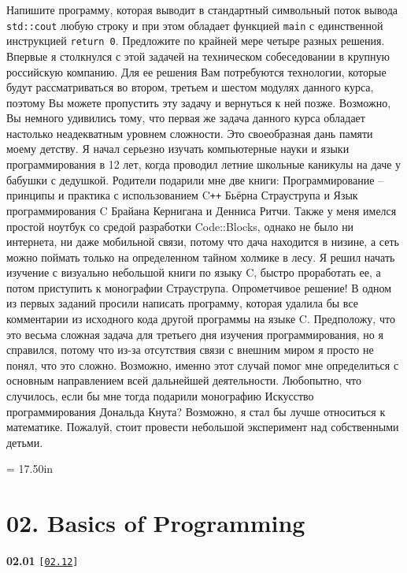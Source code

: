 \documentclass[a4paper,12pt]{article}
\begin{document}
Напишите программу, которая выводит в стандартный символьный поток вывода \lstinline{std::cout} любую строку и при этом обладает функцией \lstinline{main} с единственной инструкцией \lstinline{return 0}. Предложите по крайней мере четыре разных решения. Впервые я столкнулся с этой задачей на техническом собеседовании в крупную российскую компанию. Для ее решения Вам потребуются технологии, которые будут рассматриваться во втором, третьем и шестом модулях данного курса, поэтому Вы можете пропустить эту задачу и вернуться к ней позже. Возможно, Вы немного удивились тому, что первая же задача данного курса обладает настолько неадекватным уровнем сложности. Это своеобразная дань памяти моему детству. Я начал серьезно изучать компьютерные науки и языки программирования в 12 лет, когда проводил летние школьные каникулы на даче у бабушки с дедушкой. Родители подарили мне две книги: Программирование -- принципы и практика с использованием C\texttt{++} Бьёрна Страуструпа и Язык программирования C Брайана Кернигана и Денниса Ритчи. Также у меня имелся простой ноутбук со средой разработки Code::Blocks, однако не было ни интернета, ни даже мобильной связи, потому что дача находится в низине, а сеть можно поймать только на определенном тайном холмике в лесу. Я решил начать изучение с визуально небольшой книги по языку C, быстро проработать ее, а потом приступить к монографии Страуструпа. Опрометчивое решение! В одном из первых заданий просили написать программу, которая удалила бы все комментарии из исходного кода другой программы на языке C. Предположу, что это весьма сложная задача для третьего дня изучения программирования, но я справился, потому что из-за отсутствия связи с внешним миром я просто не понял, что это сложно. Возможно, именно этот случай помог мне определиться с основным направлением всей дальнейшей деятельности. Любопытно, что случилось, если бы мне тогда подарили монографию Искусство программирования Дональда Кнута? Возможно, я стал бы лучше относиться к математике. Пожалуй, стоит провести небольшой эксперимент над собственными детьми.



\newpage\thispagestyle{empty}\pdfpageheight = 17.50in\enlargethispage{100in}

\section{02. Basics of Programming}

{\large \textbf{02.01} \texttt{[\href{https://github.com/i-s-m-mipt/Education/blob/master/projects/examples/source/02.12.cpp}{\texttt{02.12}}]}}
\end{document}
